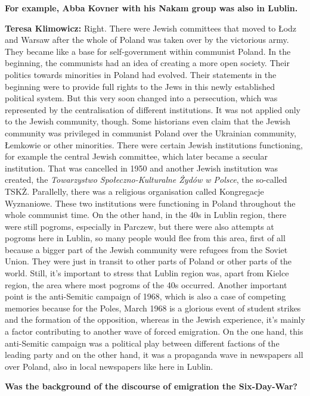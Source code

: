 \textbf{For example, Abba Kovner with his Nakam group was also in Lublin.} 

\textbf{Teresa Klimowicz:} Right. There were Jewish committees that moved to Łodz and Warsaw after the whole of Poland was taken over by the victorious army. They became like a base for self-government within communist Poland. In the beginning, the communists had an idea of creating a more open society. Their politics towards minorities in Poland had evolved. Their statements in the beginning were to provide full rights to the Jews in this newly established political system. But this very soon changed into a persecution, which was represented by the centralisation of different institutions. It was not applied only to the Jewish community, though. Some historians even claim that the Jewish community was privileged in communist Poland over the Ukrainian community, Łemkowie or other minorities. There were certain Jewish institutions functioning, for example the central Jewish committee, which later became a secular institution. That was cancelled in 1950 and another Jewish institution was created, the \textit{Towarzystwo Społeczno-Kulturalne Żydów w Polsce}, the so-called TSKŻ. Parallelly, there was a religious organisation called Kongregacje Wyznaniowe. These two institutions were functioning in Poland throughout the whole communist time. On the other hand, in the 40s in Lublin region, there were still pogroms, especially in Parczew, but there were also attempts at pogroms here in Lublin, so many people would flee from this area, first of all because a bigger part of the Jewish community were refugees from the Soviet Union. They were just in transit to other parts of Poland or other parts of the world. Still, it's important to stress that Lublin region was, apart from Kielce region, the area where most pogroms of the 40s occurred. Another important point is the anti-Semitic campaign of 1968, which is also a case of competing memories because for the Poles, March 1968 is a glorious event of student strikes and the formation of the opposition, whereas in the Jewish experience, it's mainly a factor contributing to another wave of forced emigration. On the one hand, this anti-Semitic campaign was a political play between different factions of the leading party and on the other hand, it was a propaganda wave in newspapers all over Poland, also in local newspapers like here in Lublin.  

\textbf{Was the background of the discourse of emigration the Six-Day-War?} 

